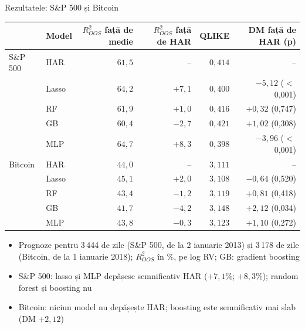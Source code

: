 \begin{frame}{Rezultatele: S\&P 500 și Bitcoin}
\itemsize{\footnotesize}
\begin{center}
\scriptsize
\begin{tabular}{llrrrr}
\toprule
& Model & $R^2_{OOS}$ față de medie & $R^2_{OOS}$ față de HAR & QLIKE & DM față de HAR (p) \\
\midrule
S\&P 500 & HAR & $61{,}5$ & -- & $0{,}414$ & -- \\
 & Lasso & $64{,}2$ & ${+7{,}1}$ & $0{,}400$ & ${-5{,}12}$ ($<$\,0{,}001) \\
 & RF & $61{,}9$ & ${+1{,}0}$ & $0{,}416$ & ${+0{,}32}$ (0{,}747) \\
 & GB & $60{,}4$ & ${-2{,}7}$ & $0{,}421$ & ${+1{,}02}$ (0{,}308) \\
 & MLP & $64{,}7$ & ${+8{,}3}$ & $0{,}398$ & ${-3{,}96}$ ($<$\,0{,}001) \\
\midrule
Bitcoin & HAR & $44{,}0$ & -- & $3{,}111$ & -- \\
 & Lasso & $45{,}1$ & ${+2{,}0}$ & $3{,}108$ & ${-0{,}64}$ (0{,}520) \\
 & RF & $43{,}4$ & ${-1{,}2}$ & $3{,}119$ & ${+0{,}81}$ (0{,}418) \\
 & GB & $41{,}7$ & ${-4{,}2}$ & $3{,}148$ & ${+2{,}12}$ (0{,}034) \\
 & MLP & $43{,}8$ & ${-0{,}3}$ & $3{,}123$ & ${+1{,}10}$ (0{,}272) \\
\bottomrule
\end{tabular}
\end{center}
\begin{itemize}
    \item Prognoze pentru 3\,444 de zile (S\&P 500, de la 2 ianuarie 2013) și 3\,178 de zile (Bitcoin, de la 1 ianuarie 2018); $R^2_{OOS}$ în \%, pe log RV; GB: gradient boosting
    \item S\&P 500: lasso și MLP depășesc semnificativ HAR ($+7{,}1\%$; $+8{,}3\%$); random forest și boosting nu
    \item Bitcoin: niciun model nu depășește HAR; boosting este semnificativ mai slab (DM $+2{,}12$)
\end{itemize}
\end{frame}

